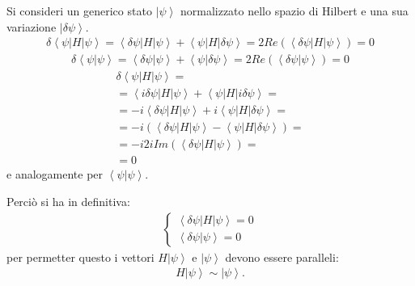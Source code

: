 Si consideri un generico stato $\left |\psi  \right\rangle$ normalizzato nello spazio di Hilbert e una sua variazione $\left |\delta\psi  \right\rangle$.
\begin{equation}\begin{split}
\delta\left\langle \psi |H|\psi  \right\rangle=\left\langle \delta\psi |H|\psi  \right\rangle+\left\langle \psi |H|\delta\psi  \right\rangle=2Re\left(\left\langle \delta\psi |H|\psi  \right\rangle\right)=0
\end{split}\end{equation}
\begin{equation}\begin{split}
\delta\left\langle \psi |\psi  \right\rangle=\left\langle \delta\psi |\psi  \right\rangle+\left\langle \psi |\delta\psi  \right\rangle=2Re\left(\left\langle \delta\psi |\psi  \right\rangle\right)=0
\end{split}\end{equation}
\begin{equation}\begin{split}
\delta\left\langle \psi |H|\psi  \right\rangle=\\
=\left\langle i\delta\psi |H|\psi  \right\rangle+\left\langle \psi |H|i\delta\psi  \right\rangle=\\
=-i\left\langle \delta\psi |H|\psi  \right\rangle+i\left\langle \psi |H|\delta\psi  \right\rangle=\\
=-i\left(\left\langle \delta\psi |H|\psi  \right\rangle-\left\langle \psi |H|\delta\psi  \right\rangle\right)=\\
=-i2iIm\left(\left\langle \delta\psi |H|\psi  \right\rangle\right)=\\
=0
\end{split}\end{equation}
e analogamente per $\left\langle \psi |\psi  \right\rangle$.

Perciò si ha in definitiva:
\begin{equation}\begin{split}
\begin{cases}
\left\langle \delta\psi |H|\psi  \right\rangle=0\\
\left\langle \delta\psi |\psi  \right\rangle=0
\end{cases}
\end{split}\end{equation}
per permetter questo i vettori $H\left |\psi \right\rangle$ e $\left |\psi \right\rangle$ devono essere paralleli:
\begin{equation}\begin{split}
H\left |\psi  \right\rangle\sim \left |\psi  \right\rangle.
\end{split}\end{equation}

